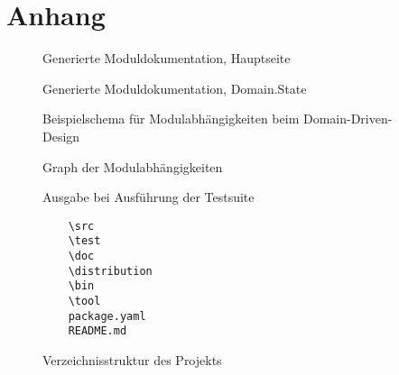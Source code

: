 \section{Anhang} \label{Anhang}

\begin{figure}[ht]
    \caption{Generierte Moduldokumentation, Hauptseite}
    \label{module-doc-index}
\end{figure}

\begin{figure}[ht]
    \caption{Generierte Moduldokumentation, Domain.State}
    \label{module-doc-state}
\end{figure}

\begin{figure}[ht]
    \caption{Beispielschema für Modulabhängigkeiten beim Domain-Driven-Design \cite{domain-driven-design}}
    \label{domain-driven-design-layers}
    \centering{}
\end{figure}

\begin{figure}[ht]
    \caption{Graph der Modulabhängigkeiten}
    \label{module-dependency-graph}
    \centering{}
\end{figure}

\begin{figure}[ht]
    \caption{Ausgabe bei Ausführung der Testsuite}
    \label{test-suite}
    \centering{}
\end{figure}

\begin{figure}
    \caption{Verzeichnisstruktur des Projekts}
    \label{directory-structure}
    \begin{verbatim}
    \src
    \test
    \doc
    \distribution
    \bin
    \tool
    package.yaml
    README.md
    \end{verbatim}
\end{figure}